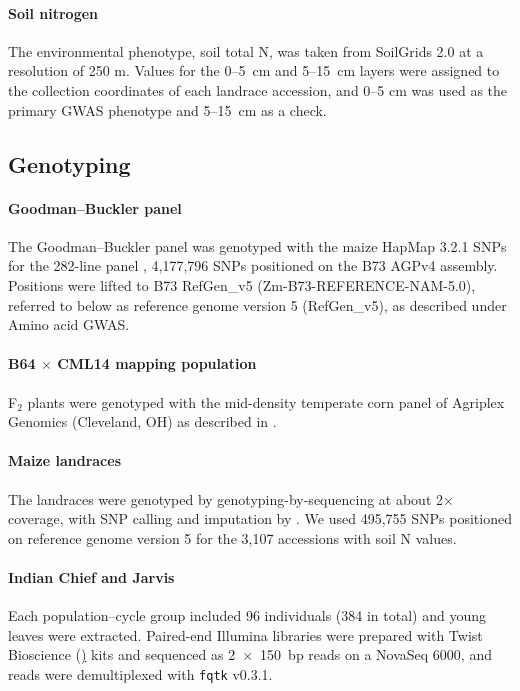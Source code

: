 \documentclass[11pt]{article}
\begin{document}
\paragraph*{Soil nitrogen}
The environmental phenotype, soil total N, was taken from SoilGrids 2.0 \citep{Poggio2021SoilGrids} at a resolution of 250 m. Values for the 0--5~cm and 5--15~cm layers were assigned to the collection coordinates of each landrace accession, and 0--5 cm was used as the primary GWAS phenotype and 5--15~cm as a check.

\subsection*{Genotyping}

\paragraph*{Goodman--Buckler panel}
The Goodman--Buckler panel was genotyped with the maize HapMap 3.2.1 SNPs for the 282-line panel \citep{Bukowski2018HapMap3}, 4,177,796 SNPs positioned on the B73 AGPv4 assembly. Positions were lifted to B73 RefGen\_v5 (Zm-B73-REFERENCE-NAM-5.0), referred to below as reference genome version 5 (RefGen\_v5), as described under Amino acid GWAS.

\paragraph*{B64 $\times$ CML14 mapping population}
F$_2$ plants were genotyped with the mid-density temperate corn panel of Agriplex Genomics (Cleveland, OH) as described in \citet{Fitzsimmons2026KernelKitchen}.

\paragraph*{Maize landraces}
The landraces were genotyped by genotyping-by-sequencing at about 2$\times$ coverage, with SNP calling and imputation by \citet{RomeroNavarro2017Landraces}. We used 495,755 SNPs positioned on reference genome version 5 for the 3,107 accessions with soil N values.

\paragraph*{Indian Chief and Jarvis}

Each population--cycle group included 96 individuals (384 in total) and young leaves were extracted. Paired-end Illumina libraries were prepared with Twist Bioscience (\href{https://www.twistbioscience.com/}) kits and sequenced as 2~$\times$~150~bp reads on a NovaSeq 6000, and reads were demultiplexed with \texttt{fqtk} v0.3.1.
\end{document}

